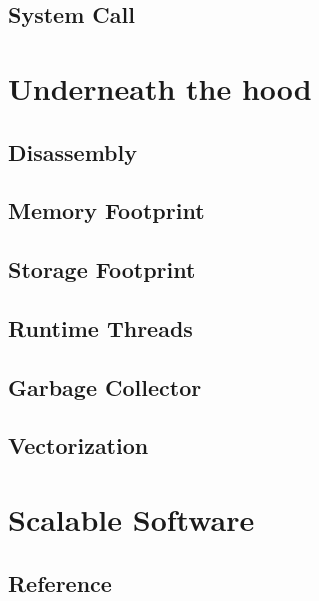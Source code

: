 \documentclass{kdp}
\begin{document}
\chapter{System Call}

\part{Underneath the hood}

\chapter{Disassembly}

\chapter{Memory Footprint}

\chapter{Storage Footprint}

\chapter{Runtime Threads}

\chapter{Garbage Collector}

\chapter{Vectorization}

\part{Scalable Software}

\chapter{Reference}
\end{document}
